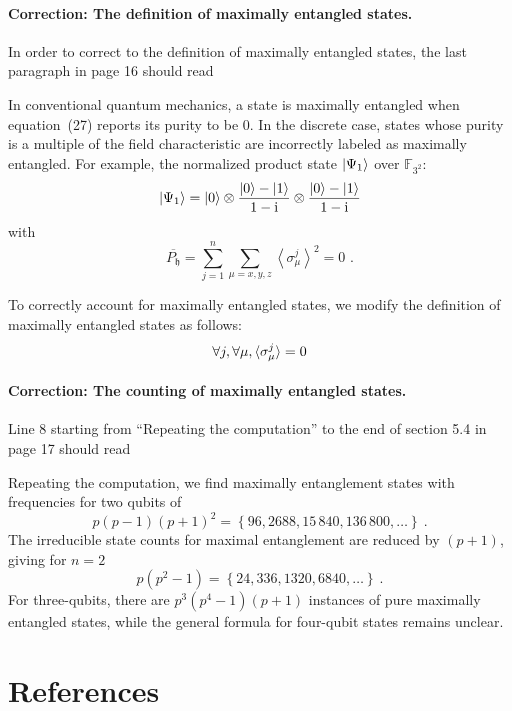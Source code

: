 \documentclass{iopart}
\newcommand{\ff}[1]{\mathbb{F}_{#1}}
\def\fh{\mathfrak{h}}
\begin{document}
\paragraph*{Correction: The definition of maximally entangled states.}

In order to correct to the definition of maximally entangled states,
the last paragraph in page 16 should read

\medskip{}


In conventional quantum mechanics, a state is maximally entangled
when equation~(27) reports its purity to be 0. In the discrete case,
states whose purity is a multiple of the field characteristic are
incorrectly labeled as maximally entangled. For example, the normalized
product state $\ket{\Psi_{1}}$ over $\ff{3^{2}}$: 
\[
\ket{\Psi_{1}}=\ket{0}\otimes\frac{\ket{0}-\ket{1}}{1-\mathrm{i}}\otimes\frac{\ket{0}-\ket{1}}{1-\mathrm{i}}
\]
with 
\[
\overline{P_{\fh}}=\sum_{j=1}^{n}\sum_{\mu=x,y,z}\left\langle \sigma_{\mu}^{j}\right\rangle ^{2}=0\textrm{ .}
\]


To correctly account for maximally entangled states, we modify the
definition of maximally entangled states as follows:
\[
\forall j,\forall\mu,\braket{\sigma_{\mu}^{j}}=0
\]
\medskip{}



\paragraph*{Correction: The counting of maximally entangled states.}

Line 8 starting from ``Repeating the computation'' to the end of
section 5.4 in page 17 should read\medskip{}


Repeating the computation, we find maximally entanglement states with
frequencies for two qubits of 
\[
p\left(p-1\right)\left(p+1\right)^{2}=\left\{ 96,2688,15\,840,136\,800,\ldots\right\} \ .
\]
The irreducible state counts for maximal entanglement are reduced
by $\left(p+1\right)$, giving for $n=2$ 
\[
p\left(p^{2}-1\right)=\left\{ 24,336,1320,6840,\ldots\right\} \ .
\]
For three-qubits, there are $p^{3}\left(p^{4}-1\right)\left(p+1\right)$
instances of pure maximally entangled states, while the general formula
for four-qubit states remains unclear.



\section*{References}

{}



\end{document}
